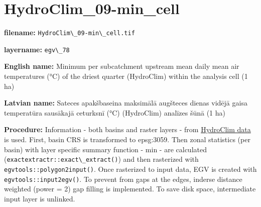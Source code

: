 \documentclass[
]{book}
\newcommand{\passthrough}[1]{#1}
\begin{document}
\section{HydroClim\_09-min\_cell}\label{ch06.078}

\textbf{filename:} \passthrough{\lstinline!HydroClim\_09-min\_cell.tif!}

\textbf{layername:} \passthrough{\lstinline!egv\_78!}

\textbf{English name:} Minimum per subcatchment upstream mean daily mean air temperatures (°C) of the driest quarter (HydroClim) within the analysis cell (1 ha)

\textbf{Latvian name:} Sateces apakšbaseina maksimālā augšteces dienas vidējā gaisa temperatūra sausākajā ceturksnī (°C) (HydroClim) analīzes šūnā (1 ha)

\textbf{Procedure:} Information - both basins and raster layers - from \hyperref[Ch04.12]{HydroClim data}
is used. First, basin CRS is transformed to epsg:3059. Then zonal statistics (per basin) with
layer specific summary function - min - are calculated (\passthrough{\lstinline!exactextractr::exact\_extract()!})
and then rasterized with \passthrough{\lstinline!egvtools::polygon2input()!}. Once rasterized to input data,
EGV is created with \passthrough{\lstinline!egvtools::input2egv()!}. To prevent from gaps at the edges,
inderse distance weighted (power = 2) gap filling is implemented. To save disk space,
intermediate input layer is unlinked.
\end{document}
